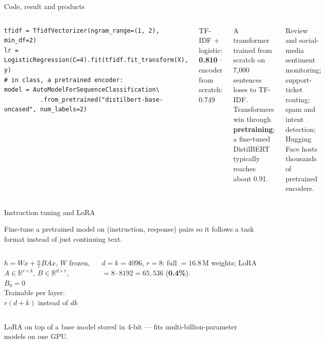 \documentclass[aspectratio=169,11pt]{beamer}
\newcommand{\rTfidf}{0.810}
\newcommand{\rEnc}{0.749}
\begin{document}
\begin{frame}[fragile]{Code, result and products}
\begin{columns}[T]
\begin{bcode}
\begin{lstlisting}
tfidf = TfidfVectorizer(ngram_range=(1, 2), min_df=2)
lr = LogisticRegression(C=4).fit(tfidf.fit_transform(X), y)
# in class, a pretrained encoder:
model = AutoModelForSequenceClassification\
          .from_pretrained("distilbert-base-uncased", num_labels=2)
\end{lstlisting}
\end{bcode}
\begin{bres}
TF-IDF + logistic: \textbf{\rTfidf} $\cdot$ encoder from scratch: \rEnc
\end{bres}
\begin{bwarn}
A transformer trained from scratch on 7,000 sentences loses to TF-IDF. Transformers win through \textbf{pretraining}; a fine-tuned DistilBERT typically reaches about 0.91.
\end{bwarn}
\begin{bapp}
Review and social-media sentiment monitoring; support-ticket routing; spam and intent detection; Hugging Face hosts thousands of pretrained encoders.
\end{bapp}
\end{columns}
\end{frame}


\begin{frame}{Instruction tuning and LoRA}
\begin{bdef}
Fine-tune a pretrained model on (instruction, response) pairs so it follows a task format instead of just continuing text.
\end{bdef}
\begin{columns}[T]
\begin{bmath}
$h=Wx+\frac{\alpha}{r}BAx$, \; $W$ frozen,\\ $A\in\mathbb{R}^{r\times k}$, $B\in\mathbb{R}^{d\times r}$, $B_0=0$\\[3pt]
Trainable per layer: $r(d+k)$ instead of $dk$
\end{bmath}
\begin{bex}
$d=k=4096$, $r=8$: full $=16.8$\,M weights; LoRA $=8\cdot8192=65{,}536$ (\textbf{0.4\%}).
\end{bex}
\end{columns}
\begin{bdef}[QLoRA]
LoRA on top of a base model stored in 4-bit --- fits multi-billion-parameter models on one GPU.
\end{bdef}
\end{frame}
\end{document}
